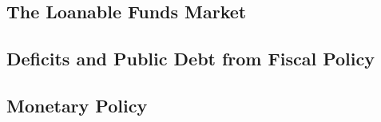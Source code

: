 \documentclass[11 pt, twoside]{article}
\begin{document}
\subsection{The Loanable Funds Market}
\subsection{Deficits and Public Debt from Fiscal Policy}
\subsection{Monetary Policy}
\end{document}
